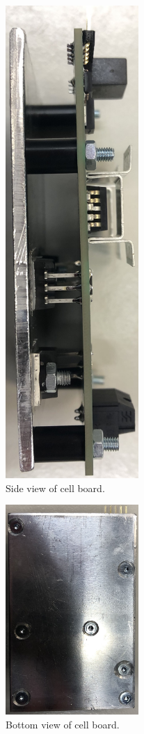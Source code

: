 \begin{figure}[h!]
    \centering
    \includegraphics[width=0.45\textwidth]{CellBoardSide.jpg}
    \caption{Side view of cell board.}
    \label{fig:CellBoardSide}
\end{figure}

\begin{figure}[h!]
    \centering
    \includegraphics[width=0.45\textwidth]{CellBoardBottom.jpg}
    \caption{Bottom view of cell board.}
    \label{fig:CellBoardBottom}
\end{figure}

